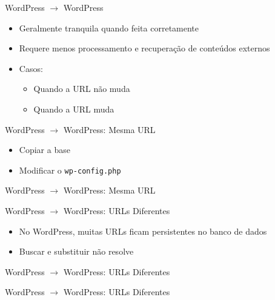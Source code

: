 \documentclass[handout]{beamer}
\begin{document}
\begin{frame}{WordPress $\rightarrow$ WordPress}
\begin{itemize}
  \pause \item Geralmente tranquila quando feita corretamente
  \pause \item Requere menos processamento e recuperação de conteúdos
               externos
  \pause \item Casos:
    \begin{itemize}
      \pause \item Quando a URL não muda
      \pause \item Quando a URL muda
    \end{itemize}
\end{itemize}
\end{frame}

\begin{frame}{WordPress $\rightarrow$ WordPress: Mesma URL}
\begin{itemize}
  \pause \item Copiar a base
  \pause \item Modificar o \texttt{wp-config.php}
\end{itemize}
\end{frame}

\begin{frame}[fragile]{WordPress $\rightarrow$ WordPress: Mesma URL}
  
\end{frame}

\begin{frame}{WordPress $\rightarrow$ WordPress: URLs Diferentes}
\begin{itemize}
  \pause \item No WordPress, muitas URLs ficam persistentes no banco de dados
  \pause \item Buscar e substituir não resolve
\end{itemize}
\end{frame}

\begin{frame}[fragile]{WordPress $\rightarrow$ WordPress: URLs Diferentes}
  
  \pause
  
\end{frame}

\begin{frame}[fragile]{WordPress $\rightarrow$ WordPress: URLs Diferentes}
  
  \pause
  
  \pause
  
\end{frame}
\end{document}
